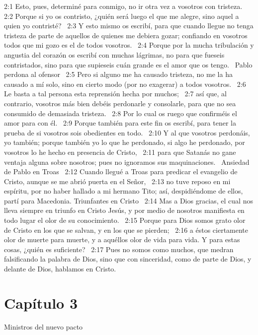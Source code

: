 2:1 Esto, pues, determiné para conmigo, no ir otra vez a vosotros con tristeza.  
2:2 Porque si yo os contristo, ¿quién será luego el que me alegre, sino aquel a quien yo contristé?  
2:3 Y esto mismo os escribí, para que cuando llegue no tenga tristeza de parte de aquellos de quienes me debiera gozar; confiando en vosotros todos que mi gozo es el de todos vosotros.  
2:4 Porque por la mucha tribulación y angustia del corazón os escribí con muchas lágrimas, no para que fueseis contristados, sino para que supieseis cuán grande es el amor que os tengo.  
Pablo perdona al ofensor  
2:5 Pero si alguno me ha causado tristeza, no me la ha causado a mí solo, sino en cierto modo (por no exagerar) a todos vosotros.  
2:6 Le basta a tal persona esta reprensión hecha por muchos;  
2:7 así que, al contrario, vosotros más bien debéis perdonarle y consolarle, para que no sea consumido de demasiada tristeza.  
2:8 Por lo cual os ruego que confirméis el amor para con él.  
2:9 Porque también para este fin os escribí, para tener la prueba de si vosotros sois obedientes en todo.  
2:10 Y al que vosotros perdonáis, yo también; porque también yo lo que he perdonado, si algo he perdonado, por vosotros lo he hecho en presencia de Cristo,  
2:11 para que Satanás no gane ventaja alguna sobre nosotros; pues no ignoramos sus maquinaciones.  
Ansiedad de Pablo en Troas  
2:12 Cuando llegué a Troas para predicar el evangelio de Cristo, aunque se me abrió puerta en el Señor,  
2:13 no tuve reposo en mi espíritu, por no haber hallado a mi hermano Tito; así, despidiéndome de ellos, partí para Macedonia. 
Triunfantes en Cristo  
2:14 Mas a Dios gracias, el cual nos lleva siempre en triunfo en Cristo Jesús, y por medio de nosotros manifiesta en todo lugar el olor de su conocimiento.  
2:15 Porque para Dios somos grato olor de Cristo en los que se salvan, y en los que se pierden;  
2:16 a éstos ciertamente olor de muerte para muerte, y a aquéllos olor de vida para vida. Y para estas cosas, ¿quién es suficiente?  
2:17 Pues no somos como muchos, que medran falsificando la palabra de Dios, sino que con sinceridad, como de parte de Dios, y delante de Dios, hablamos en Cristo.  
\section*{Capítulo 3 }
Ministros del nuevo pacto  

